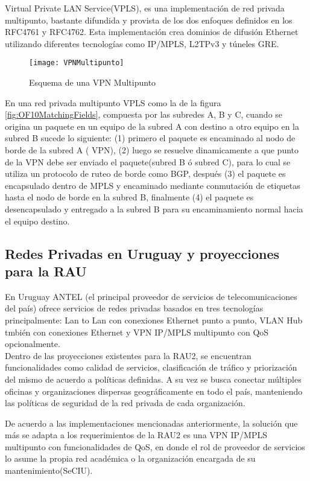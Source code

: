 Virtual Private LAN Service(VPLS), es una implementaci\'on de red privada multipunto, bastante difundida y provista de los dos enfoques definidos en los RFC4761\citep{kompella2007virtual} y RFC4762\cite{lasserre2007virtual}. Esta implementaci\'on crea dominios de difusión Ethernet utilizando diferentes tecnologías como IP/MPLS, L2TPv3 y túneles GRE.

\begin{figure}[htbp!] 
\centering    
\texttt{[image: VPNMultipunto]}
\caption[Esquema de una VPN Multipunto]{Esquema de una VPN Multipunto}
\label{fig:VPNMulipunto}
\end{figure}
 
En una red privada multipunto VPLS como la de la figura \ref{fig:OF10MatchingFields}, compuesta por las subredes A, B y C, cuando se origina un paquete en un equipo de la subred A con destino a otro equipo en la subred B sucede lo siguiente: (1) primero el paquete es encaminado al nodo de borde de la subred A ( VPN), (2) luego se resuelve dinamicamente a que punto de la VPN debe ser enviado el paquete(subred B \'o subred C), para lo cual se utiliza un protocolo de ruteo de borde como BGP, despu\'es (3) el paquete es encapsulado dentro de MPLS y encaminado mediante conmutaci\'on de etiquetas hasta el nodo de borde en la subred B, finalmente (4) el paquete es desencapsulado y entregado a la subred B para su encaminamiento normal hacia el equipo destino.

\subsection{Redes Privadas en Uruguay y proyecciones para la RAU}
En Uruguay ANTEL (el principal proveedor de servicios de telecomunicaciones del país) ofrece servicios de redes privadas basados en tres tecnolog\'ias principalmente: Lan to Lan con conexiones Ethernet punto a punto, VLAN Hub tmbi\'en con conexiones Ethernet y VPN IP/MPLS multipunto con QoS opcionalmente.\\

Dentro de las proyecciones existentes para la RAU2, se encuentran funcionalidades como calidad de servicios, clasificaci\'on de tr\'afico y priorizaci\'on del mismo de acuerdo a pol\'iticas definidas. A su vez se busca conectar m\'ultiples oficinas y organizaciones dispersas geogr\'aficamente en todo el país, manteniendo las pol\'iticas de seguridad de la red privada de cada organizaci\'on. 

De acuerdo a las implementaciones mencionadas anteriormente, la soluci\'on que m\'as se adapta a los requerimientos de la RAU2 es una VPN IP/MPLS multipunto con funcionalidades de QoS, en donde el rol de proveedor de servicios lo asume la propia red académica o la organizaci\'on encargada de su mantenimiento(SeCIU).\\ 


